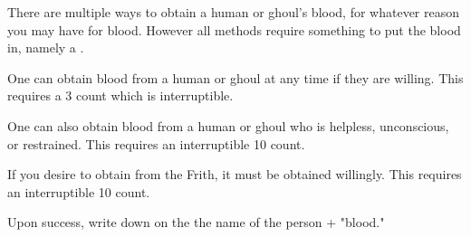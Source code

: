 \documentclass[green]{guildcamp4}
\begin{document}
\name{\gGotBlood{}}

There are multiple ways to obtain a human or ghoul's blood, for whatever reason you may have for blood. 
However all methods require something to put the blood in, namely a \iTestTube{}. 

One can obtain blood from a human or ghoul at any time if they are willing. This requires a 3 count which is interruptible.

One can also obtain blood from a human or ghoul who is helpless, unconscious, or restrained. This requires an interruptible 10 count.

If you desire to obtain from the Frith, it must be obtained willingly. This requires an interruptible 10 count.

Upon success, write down on the \iTestTube{} the name of the person + "blood."
\end{document}
